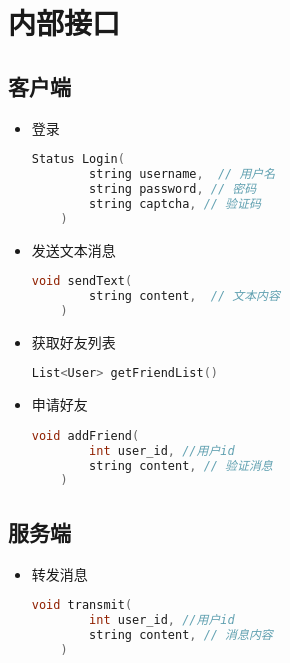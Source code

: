 {\color{red}
\section{内部接口}
\subsection{客户端}
\begin{itemize}
    \item 登录
    \begin{lstlisting}[language=c++]
    Status Login(
        string username,  // 用户名
        string password, // 密码
        string captcha, // 验证码
    )
    \end{lstlisting}

    \item 发送文本消息
    \begin{lstlisting}[language=c++]
    void sendText(
        string content,  // 文本内容
    )
    \end{lstlisting}

    \item 获取好友列表
    \begin{lstlisting}[language=c++]
    List<User> getFriendList()
    \end{lstlisting}

    \item 申请好友
    \begin{lstlisting}[language=c++]
    void addFriend(
        int user_id, //用户id
        string content, // 验证消息
    )
    \end{lstlisting}
\end{itemize}
\subsection{服务端}
\begin{itemize}
    \item 转发消息
    \begin{lstlisting}[language=c++]
    void transmit(
        int user_id, //用户id
        string content, // 消息内容
    )
    \end{lstlisting}
\end{itemize}
}
